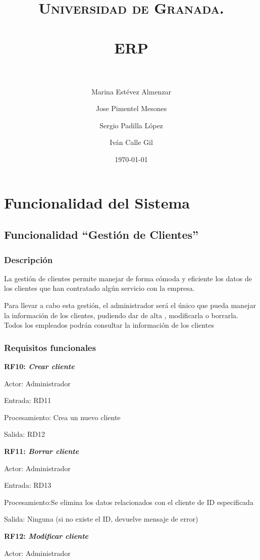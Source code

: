 \documentclass[paper=a4, fontsize=11pt, spanish]{scrartcl}
\title{
  \normalfont \normalsize
  \textsc{Universidad de Granada.} \\ [25pt]
  \horrule{0.5pt} \\[0.4cm]
  \huge ERP \\
  \horrule{2pt} \\[0.5cm]
}
\author{Marina Estévez Almenzar\\
\and
Jose Pimentel Mesones\\
\and
Sergio Padilla López\\
\and
Iván Calle Gil\\}
\date{\normalsize\today}
\begin{document}
\maketitle

\section{Funcionalidad del Sistema}

\subsection{Funcionalidad “Gestión de Clientes”}

\subsubsection{Descripción}
\setlength{\parindent}{3em} La gestión de clientes permite manejar de forma cómoda y eficiente los datos de los clientes que han contratado algún servicio con la empresa.

Para llevar a cabo esta gestión, el administrador será el único que pueda manejar la información de los clientes, pudiendo dar de alta , modificarla o borrarla.
Todos los empleados podrán consultar la información de los clientes

\subsubsection{Requisitos funcionales}
\setlength{\parindent}{0em}
\textbf{RF10: \textit{Crear cliente}}
\setlength{\parindent}{2em}

Actor: Administrador

Entrada: RD11

Procesamiento: Crea un nuevo cliente

Salida: RD12

\setlength{\parindent}{0em}
\textbf{RF11: \textit{Borrar cliente}}
\setlength{\parindent}{2em}

Actor: Administrador

Entrada: RD13

Procesamiento:Se elimina los datos relacionados con el cliente de ID especificada

Salida: Ninguna (si no existe el ID, devuelve mensaje de error)

\setlength{\parindent}{0em}
\textbf{RF12: \textit{Modificar cliente}}
\setlength{\parindent}{2em}

Actor: Administrador
\end{document}
